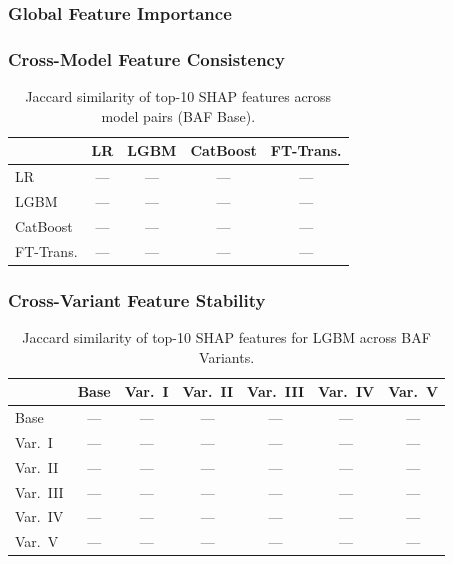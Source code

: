 \subsubsection{Global Feature Importance}


\subsubsection{Cross-Model Feature Consistency}

\begin{table}[ht]
\centering
\caption{Jaccard similarity of top-10 SHAP features across model pairs (BAF Base).}
\label{tab:shap_consistency}
\begin{tabular}{l c c c c}
\toprule
          & LR   & LGBM & CatBoost & FT-Trans. \\
\midrule
LR        & ---  & ---  & ---      & ---  \\
LGBM      & ---  & ---  & ---      & ---  \\
CatBoost  & ---  & ---  & ---      & ---  \\
FT-Trans. & ---  & ---  & ---      & ---  \\
\bottomrule
\end{tabular}
\end{table}

\subsubsection{Cross-Variant Feature Stability}

\begin{table}[ht]
\centering
\caption{Jaccard similarity of top-10 SHAP features for LGBM across BAF Variants.}
\label{tab:shap_stability}
\begin{tabular}{l c c c c c c}
\toprule
         & Base & Var.~I & Var.~II & Var.~III & Var.~IV & Var.~V \\
\midrule
Base     & --- & --- & --- & --- & --- & --- \\
Var.~I   & --- & --- & --- & --- & --- & --- \\
Var.~II  & --- & --- & --- & --- & --- & --- \\
Var.~III & --- & --- & --- & --- & --- & --- \\
Var.~IV  & --- & --- & --- & --- & --- & --- \\
Var.~V   & --- & --- & --- & --- & --- & --- \\
\bottomrule
\end{tabular}
\end{table}

